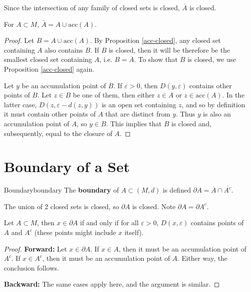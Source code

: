 \documentclass[10pt]{report}
\begin{document}
Since the intersection of any family of closed sets is closed, $\overline{A}$ is closed.

\begin{prop}
	For $A \subset M$, $\bar{A}=A \cup \text{acc}(A)$.
\end{prop}
\begin{proof}
	Let $B=A \cup \text{acc}(A)$. By Proposition \ref{acc-closed}, any closed set containing $A$ also contains $B$. If $B$ is closed, then it will be therefore be the smallest closed set containing $A$, i.e. $B = \overline{A}$. To show that $B$ is closed, we use Proposition \ref{acc-closed} again.

	Let $y$ be an accumulation point of $B$. If $\varepsilon>0$, then $D(y,\varepsilon)$ contains other points of $B$. Let $z \in B$ be one of them, then either $z \in A$ or $ z \in \text{acc}(A)$. In the latter case, $D(z, \varepsilon-d(z,y))$ is an open set containing $z$, and so by definition it must contain other points of $A$ that are distinct from $y$. Thus $y$ is also an accumulation point of $A$, so $y \in B$. This implies that $B$ is closed and, subsequently, equal to the closure of $A$.
\end{proof}



\section{Boundary of a Set}
\begin{defn}{Boundary}{boundary}
	The \textbf{boundary} of $A \subset (M,d)$ is defined $\partial A = \overline{A}\cap \overline{A^c}$.
\end{defn}
The union of 2 closed sets is closed, so $\partial A$ is closed. Note $\partial A = \partial A^c $.

\begin{prop}
	Let $A \subset M$, then $x \in \partial A$ if and only if for all $\varepsilon>0$, $D(x,\varepsilon)$ contains points of $A$ and $A^c$ (these points might include $x$ itself).
\end{prop}
\begin{proof}
	\textbf{Forward:} Let $x \in \partial A$. If $x \in A$, then it must be an accumulation point of $A^c$. If $x \in A^c$, then it must be an accumulation point of $A$. Either way, the conclusion follows.

	\textbf{Backward:}  The same cases apply here, and the argument is similar.
\end{proof}
\end{document}
